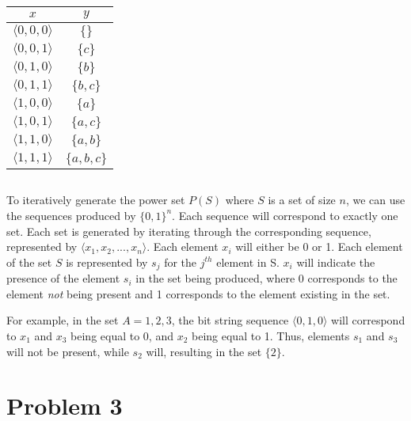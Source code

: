 \documentclass[titlepage]{article}
\begin{document}
\begin{center}
\begin{tabular}{c|c}
\textbf{$x$} & \textbf{$y$} \\ \hline
\(\langle0,0,0\rangle\) & \(\{ \}\) \\
\(\langle0,0,1\rangle\) & \(\{c\}\) \\
\(\langle0,1,0\rangle\) & \(\{b\}\) \\
\(\langle0,1,1\rangle\) & \(\{b,c\}\) \\
\(\langle1,0,0\rangle\) & \(\{a\}\) \\
\(\langle1,0,1\rangle\) & \(\{a,c\}\) \\
\(\langle1,1,0\rangle\) & \(\{a,b\}\) \\
\(\langle1,1,1\rangle\) & \(\{a,b,c\}\) \\
\end{tabular}
\end{center}

\subsection{}

To iteratively generate the power set $P(S)$ where $S$ is a set of size $n$, we can use the sequences produced by $\{0,1\}^n$. Each sequence will correspond to exactly one set. Each set is generated by iterating through the corresponding sequence, represented by \(\langle x_1,x_2,...,x_n\rangle\). Each element $x_i$ will either be 0 or 1. Each element of the set $S$ is represented by $s_j$ for the $j^{th}$ element in S. $x_i$ will indicate the presence of the element $s_i$ in the set being produced, where 0 corresponds to the element \textit{not} being present and 1 corresponds to the element existing in the set. 

For example, in the set $A = {1,2,3}$, the bit string sequence \(\langle0,1,0\rangle\) will correspond to $x_1$ and $x_3$ being equal to 0, and $x_2$ being equal to 1. Thus, elements $s_1$ and $s_3$ will not be present, while $s_2$ will, resulting in the set \(\{2\}\).

\section{Problem 3}

\subsection{}
\end{document}
